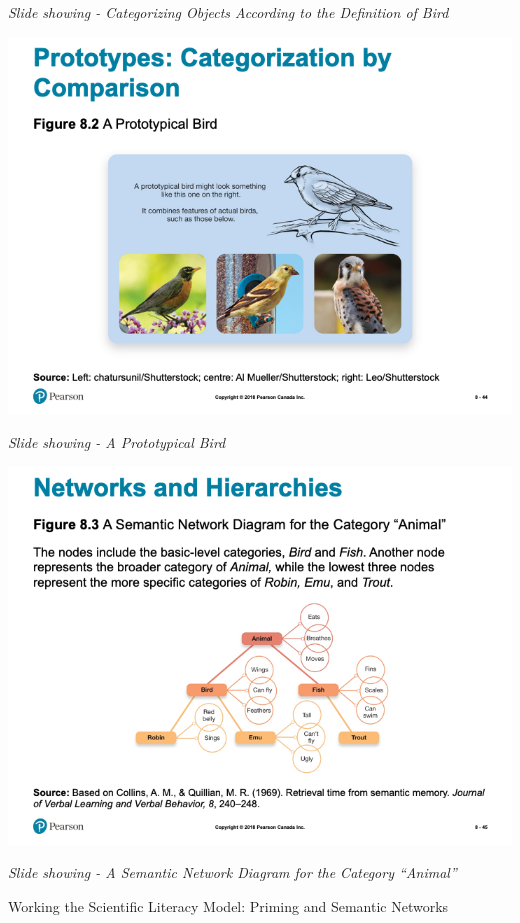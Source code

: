 \documentclass[
]{book}
\begin{document}
\emph{Slide showing - Categorizing Objects According to the Definition of Bird}

\includegraphics{assets/unit_1/slide_44.png}

\emph{Slide showing - A Prototypical Bird}

\includegraphics{assets/unit_1/slide_45.png}

\emph{Slide showing - A Semantic Network Diagram for the Category ``Animal''}

Working the Scientific Literacy Model: Priming and Semantic
Networks
\end{document}
